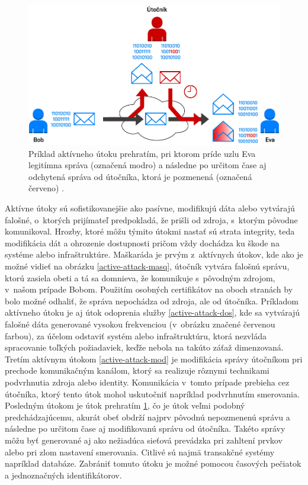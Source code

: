 \begin{figure}[H]
	\begin{center}
		\includegraphics[scale=0.55]{obrazky/active-attack-reply.pdf}
	\end{center}
	\caption[Aktívny útok prehratím]{Príklad aktívneho útoku prehratím, pri ktorom príde uzlu Eva legitímna správa (označená modro) a následne po určitom čase aj odchytená správa od útočníka, ktorá je pozmenená (označená červeno) \cite{Stallings2011}.}
	\label{active-attack-reply}
\end{figure}


Aktívne útoky sú sofistikovanejšie ako pasívne, modifikujú dáta alebo vytvárajú falošné, o~ktorých prijímateľ predpokladá, že prišli od zdroja, s~ktorým pôvodne komunikoval. Hrozby, ktoré môžu týmito útokmi nastať sú strata integrity, teda modifikácia dát a ohrozenie dostupnosti pričom vždy dochádza ku škode na systéme alebo infraštruktúre. Maškaráda je prvým z~aktívnych útokov, kde ako je možné vidieť na obrázku \ref{active-attack-masq}, útočník vytvára falošnú správu, ktorú zasiela obeti a tá sa domnieva, že komunikuje s~pôvodným zdrojom, v~našom prípade Bobom. Použitím osobných certifikátov na oboch stranách by bolo možné odhaliť, že správa nepochádza od zdroja, ale od útočníka. Príkladom aktívneho útoku je aj útok odoprenia služby \ref{active-attack-dos}, kde sa vytvárajú falošné dáta generované vysokou frekvenciou (v~obrázku značené červenou farbou), za účelom odstaviť systém alebo infraštruktúru, ktorá nezvláda spracovanie toľkých požiadaviek, keďže nebola na takúto záťaž dimenzovaná. Tretím aktívnym útokom \ref{active-attack-mod} je modifikácia správy útočníkom pri prechode komunikačným kanálom, ktorý sa realizuje rôznymi technikami podvrhnutia zdroja alebo identity. Komunikácia v~tomto prípade prebieha cez útočníka, ktorý tento útok mohol uskutočniť napríklad podvrhnutím smerovania. Posledným útokom je útok prehratím \ref{active-attack-reply}, čo je útok veľmi podobný predchádzajúcemu, akurát obeť obdrží najprv pôvodnú nepozmenenú správu a následne po určitom čase aj modifikovanú správu od útočníka. Takéto správy môžu byť generované aj ako nežiadúca sieťová prevádzka pri zahltení prvkov alebo pri zlom nastavení smerovania. Citlivé sú najmä transakčné systémy napríklad databáze. Zabrániť tomuto útoku je možné pomocou časových pečiatok a jednoznačných identifikátorov. 




